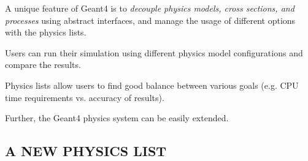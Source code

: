 \documentclass[20pt]{article}
\newenvironment{textbox}
{\begin{lrbox}{\dummybox}\begin{minipage}{0.9\columnwidth}}
{\end{minipage}\end{lrbox}\raisebox{-\depth}{\psshadowbox[framesep=1em,framearc=.1,shadow=true]{\usebox{\dummybox}}}\vspace{0.005\textheight}}
\begin{document}
\begin{center}
\begin{multicols}{3}
\begin{textbox}
A unique feature of {\sf Geant4} is to  
\emph{decouple physics models, cross sections, and processes}
using abstract interfaces, and manage the usage of different options with the physics lists.


\begin{itemize}
\item Users can run their simulation using different physics model
configurations and compare the results.
{\color{udsect}
\item Physics lists allow users to find good balance between various goals (e.g. CPU
time requirements vs. accuracy of results).
}

\item Further, the {\sf Geant4} physics system can be easily extended.
\end{itemize}

\end{textbox}


\begin{textbox}

\section*{{\Huge {\sf  A NEW PHYSICS LIST}}}


\end{textbox}
\end{multicols}
\end{center}
\end{document}
